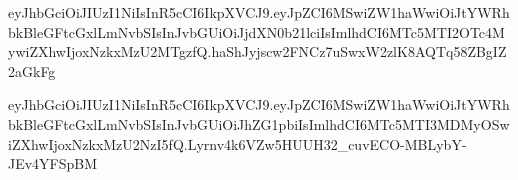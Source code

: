eyJhbGciOiJIUzI1NiIsInR5cCI6IkpXVCJ9.eyJpZCI6MSwiZW1haWwiOiJtYWRhbkBleGFtcGxlLmNvbSIsInJvbGUiOiJjdXN0b21lciIsImlhdCI6MTc5MTI2OTc4MywiZXhwIjoxNzkxMzU2MTgzfQ.haShJyjscw2FNCz7uSwxW2zlK8AQTq58ZBgIZ2aGkFg
  

eyJhbGciOiJIUzI1NiIsInR5cCI6IkpXVCJ9.eyJpZCI6MSwiZW1haWwiOiJtYWRhbkBleGFtcGxlLmNvbSIsInJvbGUiOiJhZG1pbiIsImlhdCI6MTc5MTI3MDMyOSwiZXhwIjoxNzkxMzU2NzI5fQ.Lyrnv4k6VZw5HUUH32_cuvECO-MBLybY-JEv4YFSpBM
  